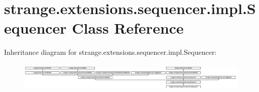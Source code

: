 \hypertarget{classstrange_1_1extensions_1_1sequencer_1_1impl_1_1_sequencer}{\section{strange.\-extensions.\-sequencer.\-impl.\-Sequencer Class Reference}
\label{classstrange_1_1extensions_1_1sequencer_1_1impl_1_1_sequencer}
}
Inheritance diagram for strange.\-extensions.\-sequencer.\-impl.\-Sequencer\-:\begin{figure}[H]
\begin{center}
\leavevmode
\includegraphics[height=1.368524cm]{classstrange_1_1extensions_1_1sequencer_1_1impl_1_1_sequencer}
\end{center}
\end{figure}
